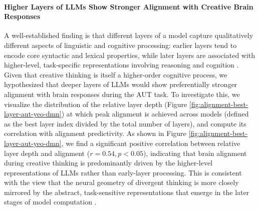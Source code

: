 \paragraph{Higher Layers of LLMs Show Stronger Alignment with Creative Brain Responses}
A well-established finding is that different layers of a model capture qualitatively different aspects of linguistic and cognitive processing: earlier layers tend to encode core syntactic and lexical properties, while later layers are associated with higher-level, task-specific representations involving reasoning and cognition \citep{tenney2019bert, jawahar-etal-2019-bert}. Given that creative thinking is itself a higher-order cognitive process, we hypothesized that deeper layers of LLMs would show preferentially stronger alignment with brain responses during the AUT task. To investigate this, we visualize the distribution of the relative layer depth (Figure \ref{fig:alignment-best-layer-aut-yeo-dmn}) at which peak alignment is achieved across models (defined as the best layer index divided by the total number of layers), and compute its correlation with alignment predictivity. As shown in Figure \ref{fig:alignment-best-layer-aut-yeo-dmn}, we find a significant positive correlation between relative layer depth and alignment ($r=0.54, p<0.05$), indicating that brain alignment during creative thinking is predominantly driven by the higher-level representations of LLMs rather than early-layer processing. This is consistent with the view that the neural geometry of divergent thinking is more closely mirrored by the abstract, task-sensitive representations that emerge in the later stages of model computation \citep{caucheteux2022brains}.

